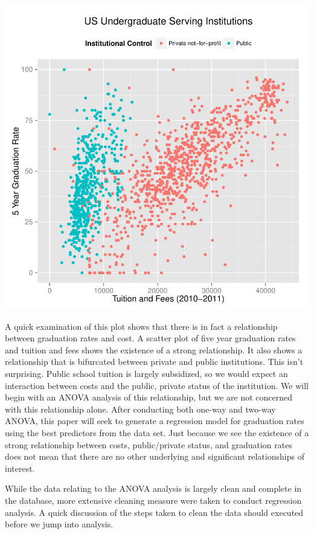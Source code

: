\documentclass{article}
\begin{document}
\includegraphics{Fig-sourceanalysis1}

A quick examination of this plot shows that there is in fact a relationship between graduation rates and cost. A scatter plot of five year graduation rates and tuition and fees shows the existence of a strong relationship. It also shows a relationship that is bifurcated between private and public institutions. This isn't surprising. Public school tuition is largely subsidized, so we would expect an interaction between costs and the public, private status of the institution. We will begin with an ANOVA analysis of this relationship, but we are not concerned with this relationship alone. After conducting both one-way and two-way ANOVA, this paper will seek to generate a regression model for graduation rates using the best predictors from the data set. Just because we see the existence of a strong relationship between costs, public/private status, and graduation rates does not mean that there are no other underlying and significant relationships of interest.

\FloatBarrier

While the data relating to the ANOVA analysis is largely clean and complete in the database, more extensive cleaning measure were taken to conduct regression analysis. A quick discussion of the steps taken to clean the data should executed before we jump into analysis.
\end{document}
